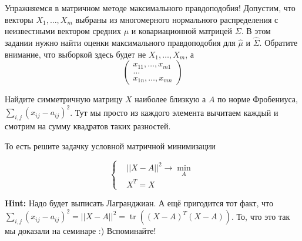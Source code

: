 \documentclass[12pt, a4paper, oneside]{article}
\theoremstyle{plain} %
\theoremstyle{definition}
\DeclareMathOperator{\tr}{tr}
\begin{document}
\begin{problem}{}
	Упражняемся в матричном методе максимального правдоподобия!  Допустим, что векторы $X_1, \ldots, X_m$ выбраны из многомерного нормального распределения с неизвестными вектором средних $\mu$ и ковариационной матрицей $\Sigma$. В этом задании нужно найти оценки максимального правдоподобия для $\hat \mu$ и $\hat \Sigma$.  Обратите внимание, что выборкой здесь будет не $X_1, \ldots, X_m$, а 
	\begin{equation*}
	\begin{pmatrix}
	x_{11}, \ldots, x_{m1} \\
	\ldots  \\ 
	x_{1n}, \ldots, x_{mn}
	\end{pmatrix}
	\end{equation*}
\end{problem}


\begin{problem}{}
	Найдите симметричную матрицу $X$ наиболее близкую а $A$ по норме Фробениуса, $\sum_{i,j} (x_{ij} - a_{ij})^2$. Тут мы просто из каждого элемента вычитаем каждый и смотрим на сумму квадратов таких разностей. 
	
	То есть решите задачку условной матричной минимизации 
	
	\begin{equation*}
	\begin{cases}
	& ||X - A||^2 \to \min_{A}  \\
	& X^T = X
	\end{cases}
	\end{equation*}
	
	\textbf{Hint:} Надо будет выписать Лагранджиан.  А ещё пригодится тот факт, что $\sum_{i,j} (x_{ij} - a_{ij})^2 = ||X-A||^2 =  \tr((X-A)^T (X-A))$. То, что это так мы доказали на семинаре :) Вспоминайте! 
\end{problem}



\end{document}
